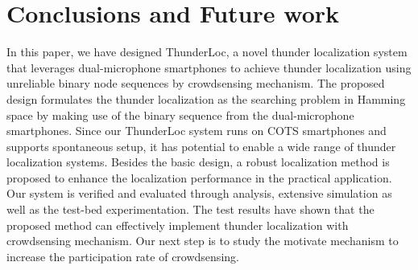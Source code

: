 
\section{Conclusions and Future work}

In this paper, we have designed ThunderLoc, a novel thunder localization system that leverages dual-microphone smartphones to achieve thunder localization using unreliable binary node sequences by crowdsensing mechanism.
The proposed design formulates the thunder localization as the searching problem in Hamming space by making use of the binary sequence from the dual-microphone smartphones.
Since our ThunderLoc system runs on COTS smartphones and supports spontaneous setup, it has potential to enable a wide range of thunder localization systems.
Besides the basic design, a robust localization method is proposed to enhance the localization performance in the practical application.
Our system is verified and evaluated through analysis, extensive simulation as well as the test-bed experimentation.
The test results have shown that the proposed method can effectively implement thunder localization with crowdsensing mechanism.
Our next step is to study the motivate mechanism to increase the participation rate of crowdsensing.



